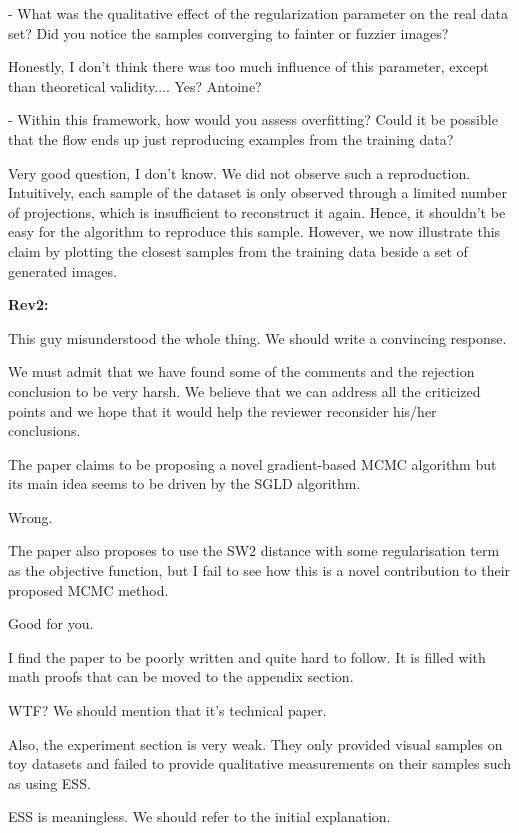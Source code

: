 \documentclass{article}
\newcommand{\rev}[1]{{\color{red} #1}}
\newcommand{\umut}[1]{{\color{blue} #1}}
\newcommand{\antoine}[1]{{\color{orange} #1}}
\begin{document}
\rev{- What was the qualitative effect of the regularization parameter on the real data set? Did you notice the samples converging to fainter or fuzzier images?}

\antoine{Honestly, I don't think there was too much influence of this parameter, except than theoretical validity....}
\umut{Yes? Antoine?}

\rev{- Within this framework, how would you assess overfitting? Could it be possible that the flow ends up just reproducing examples from the training data?}

\umut{Very good question, I don't know.}
\antoine{We did not observe such a reproduction. Intuitively, each sample of the dataset is only observed through a limited number of projections, which is insufficient to reconstruct it again. Hence, it shouldn't be easy for the algorithm to reproduce this sample. However, we now illustrate this claim by plotting the closest samples from the training data beside a set of generated images.}

\textbf{Rev2:}

\umut{This guy misunderstood the whole thing. We should write a convincing response.}

\umut{We must admit that we have found some of the comments and the rejection conclusion to be very harsh. We believe that we can address all the criticized points and we hope that it would help the reviewer reconsider his/her conclusions.
}

\rev{The paper claims to be proposing a novel gradient-based MCMC algorithm but its main idea seems to be driven by the SGLD algorithm.}

\umut{Wrong.}

\rev{The paper also proposes to use the SW2 distance with some regularisation term as the objective function, but I fail to see how this is a novel contribution to their proposed MCMC method.}

\umut{Good for you.}

\rev{I find the paper to be poorly written and quite hard to follow. It is filled with math proofs that can be moved to the appendix section.}

\umut{WTF? We should mention that it's technical paper.}

\rev{Also, the experiment section is very weak. They only provided visual samples on toy datasets and failed to provide qualitative measurements on their samples such as using ESS.}

\umut{ESS is meaningless. We should refer to the initial explanation.}
\end{document}
